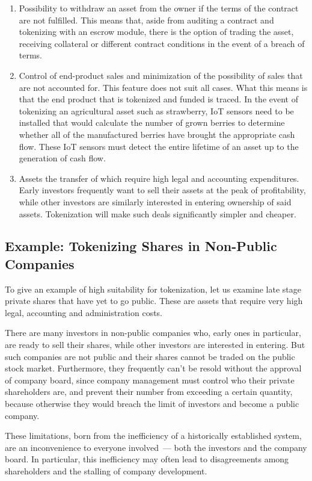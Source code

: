 \documentclass{article}
\begin{document}
\begin{multicols}{2}
\begin{enumerate}[label=(\alph*)]
\item Possibility to withdraw an asset from the owner if the terms of the contract are not fulfilled. This means that, aside from auditing a contract and tokenizing with an escrow module, there is the option of trading the asset, receiving collateral or different contract conditions in the event of a breach of terms. 
\item Control of end-product sales and minimization of the possibility of sales that are not accounted for. This feature does not suit all cases. What this means is that the end product that is tokenized and funded is traced. In the event of tokenizing an agricultural asset such as strawberry, IoT sensors need to be installed that would calculate the number of grown berries to determine whether all of the manufactured berries have brought the appropriate cash flow. These IoT sensors must detect the entire lifetime of an asset up to the generation of cash flow.
\item Assets the transfer of which require high legal and accounting expenditures. Early investors frequently want to sell their assets at the peak of profitability, while other investors are similarly interested in entering ownership of said assets. Tokenization will make such deals significantly simpler and cheaper.
\end{enumerate}

\subsection{Example: Tokenizing Shares in Non-Public Companies}

To give an example of high suitability for tokenization, let us examine late stage private shares that have yet to go public.
These are assets that require very high legal, accounting and administration costs. 

There are many investors in non-public companies who, early ones in particular, are ready to sell their shares, while other investors are interested in entering. But such companies are not public and their shares cannot be traded on the public stock market. Furthermore, they frequently can’t be resold without the approval of company board, since company management must control who their private shareholders are, and prevent their number from exceeding a certain quantity, because otherwise they would breach the limit of investors and become a public company.

These limitations, born from the inefficiency of a historically established system, are an inconvenience to everyone involved~--- both the investors and the company board. In particular, this inefficiency may often lead to disagreements among shareholders and the stalling of company development.


\end{multicols}
\end{document}

